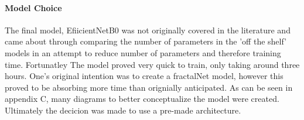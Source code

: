   \paragraph{Model Choice}
  The final model, EfiicientNetB0 was not originally covered in the literature and came about through comparing the number of parameters in the 'off the shelf' models in an attempt to reduce number of parameters and therefore training time. Fortunatley The model proved very quick to train, only taking around three hours. One's original intention was to create a fractalNet model, however this proved to be absorbing more time than orignially anticipated. As can be seen in appendix C, many diagrams to better conceptualize the model were created. Ultimately the decicion was made to use a pre-made architecture. 
